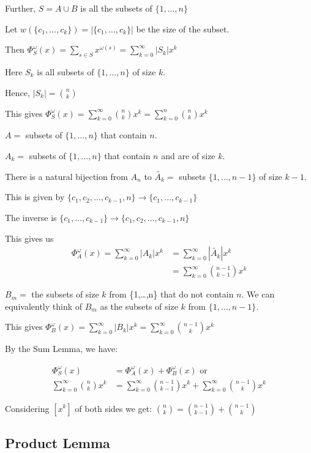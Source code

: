 \documentclass{article}
\begin{document}
Further, $S=A \cup B$ is all the subsets of $\{1,\ldots,n\}$

Let $w(\{c_1,\ldots,c_k\}) = |\{c_1,\ldots,c_k\}|$ be the size of the subset.

Then $\Phi_S^{\omega}(x) = \sum_{s \in S} x^{\omega(s)} = \sum_{k=0}^{\infty} |S_k|x^k$

Here $S_k$ is all subsets of $\{1,\ldots,n\}$ of size $k$.

Hence, $|S_k|=\binom{n}{k}$

This gives $\Phi_{S}^{\omega}(x) = \sum_{k=0}^{\infty}\binom{n}{k}x^k = \sum_{k=0}^{n}\binom{n}{k}x^k$


$A =$ subsets of $\{1,\ldots,n\}$ that contain $n$. 

$A_k =$ subsets of $\{1,\ldots,n\}$ that contain $n$ and are of size $k$. 

There is a natural bijection from $A_n$ to $\tilde{A_k} =$ subsets $\{1,\ldots,n-1\}$ of size $k-1$.


This is given by $\{c_1,c_2,\ldots,c_{k-1},n\} \to \{c_1,\ldots,c_{k-1}\}$

The inverse is $\{c_1,\ldots,c_{k-1}\} \to \{c_1,c_2,\ldots,c_{k-1},n\}$

This gives us 
\begin{align*}
\Phi_A^{\omega}(x) = \sum_{k=0}^{\infty}|A_k|x^k &= \sum_{k=0}^{\infty}|\tilde{A_k}|x^k \\
&= \sum_{k=0}^{\infty}\binom{n-1}{k-1}x^k
\end{align*}

$B_m = $ the subsets of size $k$ from \{1,\ldots,n\} that do not contain $n$. We can equivalently think of $B_m$ as the subsets of size $k$ from $\{1,\ldots,n-1\}$. 

This gives $\Phi_B^{\omega}(x) = \sum_{k=0}^{\infty}|B_k|x^k = \sum_{k=0}^{\infty}\binom{n-1}{k}x^k$

By the Sum Lemma, we have:

\begin{align*}
\Phi_S^{\omega}(x) &= \Phi_A^{\omega}(x) + \Phi_B^{\omega}(x) \text{ or} \\
\sum_{k=0}^{\infty}\binom{n}{k}x^k &= \sum_{k=0}^{\infty}\binom{n-1}{k-1}x^k + \sum_{k=0}^{\infty}\binom{n-1}{k}x^k
\end{align*}

Considering $[x^k]$ of both sides we get: $\binom{n}{k} = \binom{n-1}{k-1} + \binom{n-1}{k}$

\subsection{Product Lemma}
\end{document}
